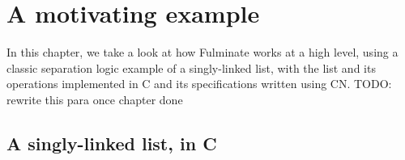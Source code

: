 \chapter{A motivating example}



In this chapter, we take a look at how Fulminate works at a high level, using a classic separation logic example of a singly-linked list, with the list and its operations implemented in C and its specifications written using CN. TODO: rewrite this para once chapter done




% 


\section{A singly-linked list, in C}\label{sec:linked-list-in-c}

